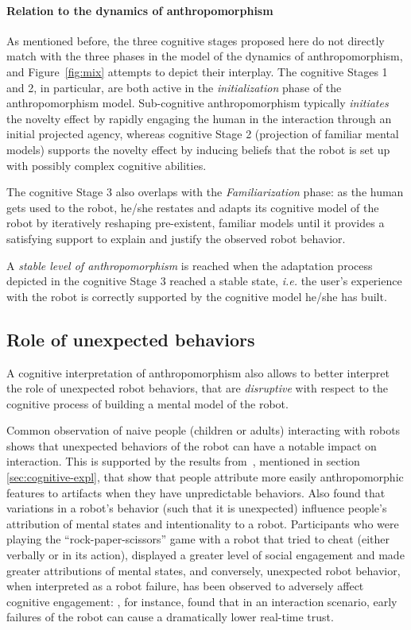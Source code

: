 \documentclass{frontiersSCNS} %
\newcommand{\ie}{\textit{i.e.}\xspace}
\begin{document}
\paragraph{Relation to the dynamics of anthropomorphism\\}

As mentioned before, the three cognitive stages proposed here do not directly
match with the three phases in the model of the dynamics of anthropomorphism,
and Figure~\ref{fig:mix} attempts to depict their interplay.
The cognitive Stages 1 and 2, in particular, are both active in the
\emph{initialization} phase of the anthropomorphism model. Sub-cognitive
anthropomorphism typically \emph{initiates} the novelty effect by rapidly
engaging the human in the interaction through an initial projected agency,
whereas cognitive Stage 2 (projection of familiar mental models) supports the
novelty effect by inducing beliefs that the robot is set up with possibly
complex cognitive abilities.

The cognitive Stage 3 also overlaps with the \emph{Familiarization} phase: as
the human gets used to the robot, he/she restates and adapts its
cognitive model of the robot by iteratively reshaping pre-existent, familiar
models until it provides a satisfying support to explain and justify the
observed robot behavior.

A \emph{stable level of anthropomorphism} is reached when the adaptation process
depicted in the cognitive Stage 3 reached a stable state, \ie the user's
experience with the robot is correctly supported by the cognitive model he/she
has built.


\subsection{Role of unexpected behaviors}
\label{sec:disruptive}

A cognitive interpretation of anthropomorphism also allows to better interpret
the role of unexpected robot behaviors, that are \emph{disruptive} with respect
to the cognitive process of building a mental model of the robot.

Common observation of naive people (children or adults) interacting with robots
shows that unexpected behaviors of the robot can have a notable impact on
interaction. This is supported by the results from~\citet{Waytz2010}, mentioned
in section \ref{sec:cognitive-expl}, that show that people attribute more easily
anthropomorphic features to artifacts when they have unpredictable behaviors.
Also \cite{short_no_2010} found that variations in a robot's behavior (such that
it is unexpected) influence people's attribution of mental states and
intentionality to a robot. Participants who were playing the
``rock-paper-scissors'' game with a robot that tried to cheat (either verbally
or in its action), displayed a greater level of social engagement and made
greater attributions of mental states, and conversely, unexpected robot
behavior, when interpreted as a robot failure, has been observed to adversely
affect cognitive engagement: \cite{desai_impact_2013}, for instance, found that
in an interaction scenario, early failures of the robot can cause a dramatically
lower real-time trust.
\end{document}
